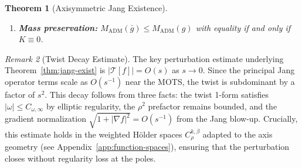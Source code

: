 \documentclass[12pt]{article}
\theoremstyle{plain}
\newtheorem{theorem}{Theorem}[section]
\theoremstyle{definition}
\theoremstyle{remark}
\newtheorem{remark}[theorem]{Remark}
\newcommand{\ADM}{\mathrm{ADM}}
\newcommand{\bg}{\bar{g}}
\newcommand{\bM}{\bar{M}}
\begin{document}
\begin{theorem}[Axisymmetric Jang Existence]
\begin{enumerate}[label=\textup{(\roman*)}]
    \begin{itemize}
        \item $\bg \in C^{0,1}(\bM)$ and extends (after adding $\Sigma$ as an inner boundary component) to a continuous, Lipschitz metric on $\overline{\bM}$;
        \item $\bg \in C^{2,\beta}(\bM \setminus \Sigma)$ is smooth away from the horizon;
        \item The cylindrical end $\mathcal{C} := \{x : s < s_0\} \cong [0,\infty) \times \Sigma$ (with $t = -\ln s$) has metric
        \[
        \bg = dt^2 + g_\Sigma + O(e^{-\beta_0 t}), \quad \beta_0 = 2\sqrt{\lambda_1(L_\Sigma)} > 0,
        \]
        where the error term and its first two derivatives decay exponentially.
    \end{itemize}
    \item \textbf{Mass preservation:} $M_{\ADM}(\bg) \leq M_{\ADM}(g)$ with equality if and only if $K \equiv 0$.
\end{enumerate}
\end{theorem}

\begin{remark}[Twist Decay Estimate]\label{rem:twist-verification-guide}
The key perturbation estimate underlying Theorem~\ref{thm:jang-exist} is $|\mathcal{T}[f]| = O(s)$ as $s \to 0$. Since the principal Jang operator terms scale as $O(s^{-1})$ near the MOTS, the twist is subdominant by a factor of $s^2$. This decay follows from three facts: the twist 1-form satisfies $|\omega| \leq C_{\omega,\infty}$ by elliptic regularity, the $\rho^2$ prefactor remains bounded, and the gradient normalization $\sqrt{1+|\nabla f|^2} = O(s^{-1})$ from the Jang blow-up. Crucially, this estimate holds in the weighted H\"older spaces $C^{k,\beta}_\rho$ adapted to the axis geometry (see Appendix~\ref{app:function-spaces}), ensuring that the perturbation closes without regularity loss at the poles.
\end{remark}
\end{document}
